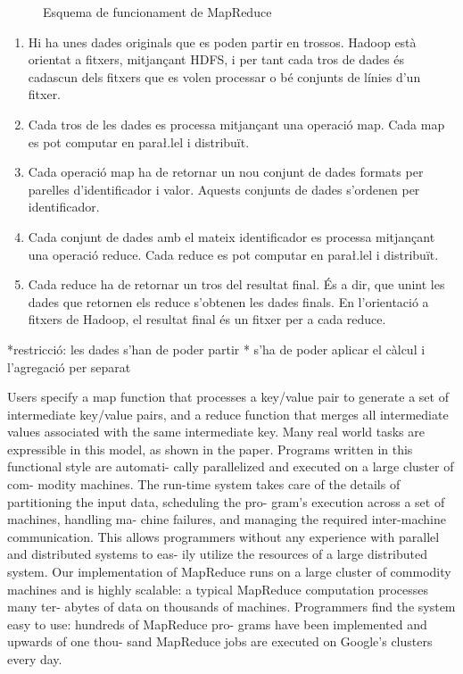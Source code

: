 \begin{figure}[tp]
  \centering
  
  \caption{Esquema de funcionament de MapReduce}
  \label{fig:mapreduce:esquema}
\end{figure}



\begin{enumerate}

\item Hi ha unes dades originals que es poden partir en
  trossos. Hadoop està orientat a fitxers, mitjançant \gls{HDFS}, i
  per tant cada tros de dades és cadascun dels fitxers que es volen
  processar o bé conjunts de línies d'un fitxer.

\item Cada tros de les dades es processa mitjançant una operació
  map. Cada map es pot computar en para\l.lel i distribuït.

\item Cada operació map ha de retornar un nou conjunt de dades
  formats per parelles d'identificador i valor. Aquests conjunts de
  dades s'ordenen per identificador. 

\item Cada conjunt de dades amb el mateix identificador es processa
  mitjançant una operació reduce. Cada reduce es pot computar en
  para\l.lel i distribuït.

\item Cada reduce ha de retornar un tros del resultat final. És a dir,
  que unint les dades que retornen els reduce s'obtenen les dades
  finals. En l'orientació a fitxers de Hadoop, el resultat final és un
  fitxer per a cada reduce.

\end{enumerate}



*restricció: les dades s'han de poder partir
* s'ha de poder aplicar el càlcul i l'agregació per separat

Users specify a map function that processes a
key/value pair to generate a set of intermediate key/value
pairs, and a reduce function that merges all intermediate
values associated with the same intermediate key. Many
real world tasks are expressible in this model, as shown
in the paper.
Programs written in this functional style are automati-
cally parallelized and executed on a large cluster of com-
modity machines. The run-time system takes care of the
details of partitioning the input data, scheduling the pro-
gram’s execution across a set of machines, handling ma-
chine failures, and managing the required inter-machine
communication. This allows programmers without any
experience with parallel and distributed systems to eas-
ily utilize the resources of a large distributed system.
Our implementation of MapReduce runs on a large
cluster of commodity machines and is highly scalable:
a typical MapReduce computation processes many ter-
abytes of data on thousands of machines. Programmers
find the system easy to use: hundreds of MapReduce pro-
grams have been implemented and upwards of one thou-
sand MapReduce jobs are executed on Google’s clusters
every day.

